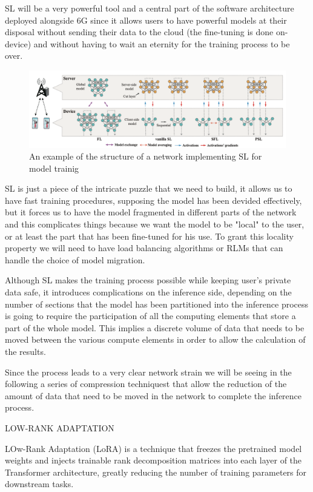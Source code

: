 SL will be a very powerful tool and a central part of the software architecture deployed alongside
6G since it allows users to have powerful models at their disposal without sending their data to the
cloud (the fine-tuning is done on-device) and without having to wait an eternity for the training
process to be over.
\begin{figure}
	\center
	\label{img:split-learning}
	\includegraphics[scale=0.65]{figures/split-learning.png}
	\caption{An example of the structure of a network implementing SL for model trainig
		\cite{split-learning}}
\end{figure}
SL is just a piece of the intricate puzzle that we need to build, it allows us to have fast training
procedures, supposing the model has been devided effectively, but it forces us to have the model
fragmented in different parts of the network and this complicates things because we want the model
to be "local" to the user, or at least the part that has been fine-tuned for his use.
To grant this locality property we will need to have load balancing algorithms or RLMs that can
handle the choice of model migration.

Although SL makes the training process possible while keeping user's private data safe, it
introduces complications on the inference side, depending on the number of sections that the model
has been partitioned into the inference process is going to require the participation of all the
computing elements that store a part of the whole model. This implies a discrete volume of data that
needs to be moved between the various compute elements in order to allow the calculation of the
results.

Since the process leads to a very clear network strain we will be seeing in the following a series
of compression techniquest that allow the reduction of the amount of data that need to be moved in
the network to complete the inference process.

\bigskip
\noindent
LOW-RANK ADAPTATION

LOw-Rank Adaptation (LoRA) is a technique that freezes the pretrained model weights and injects
trainable rank decomposition matrices into each layer of the Transformer architecture, greatly
reducing the number of training parameters for downstream tasks.

